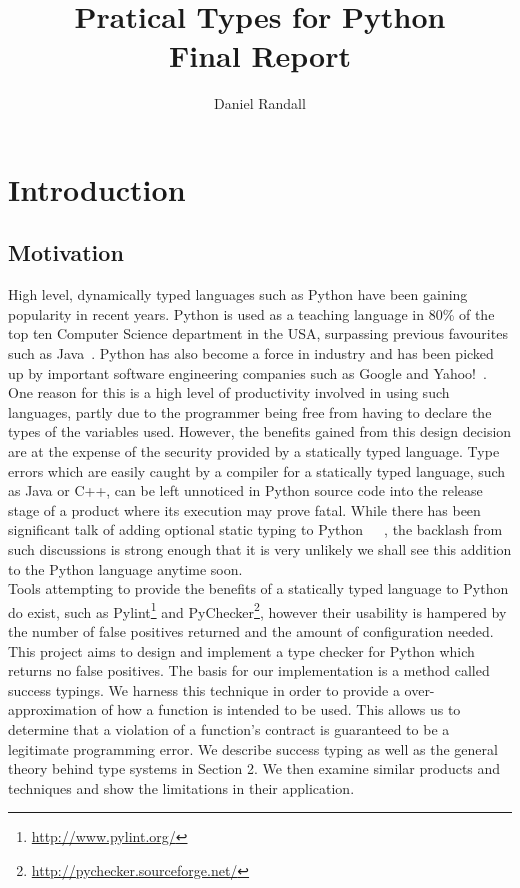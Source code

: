 \documentclass[12pt, titlepage]{article}
\title{Pratical Types for Python \\ Final Report}
\author{Daniel Randall}
\date{}
\begin{document}
\maketitle

\tableofcontents
\newpage

\section{Introduction}
\subsection{Motivation}
High level, dynamically typed languages such as Python have been gaining popularity in recent years. Python is used as a teaching language in 80\% of the top ten Computer Science department in the USA, surpassing previous favourites such as Java~\cite{guoTeaching}. Python has also become a force in industry and has been picked up by important software engineering companies such as Google and Yahoo!~\cite{organisationsPython}. One reason for this is a high level of productivity involved in using such languages, partly due to the programmer being free from having to declare the types of the variables used. However, the benefits gained from this design decision are at the expense of the security provided by a statically typed language. Type errors which are easily caught by a compiler for a statically typed language, such as Java or C++, can be left unnoticed in Python source code into the release stage of a product where its execution may prove fatal. %
While there has been significant talk of adding optional static typing to Python~\cite{guido1}~\cite{guido2}~\cite{guido3}, the backlash from such discussions is strong enough that it is very unlikely we shall see this addition to the Python language anytime soon. \\
Tools attempting to provide the benefits of a statically typed language to Python do exist, such as Pylint\footnote{\url{http://www.pylint.org/}} and PyChecker\footnote{\url{http://pychecker.sourceforge.net/}}, however their usability is hampered by the number of false positives returned and the amount of configuration needed. \\
This project aims to design and implement a type checker for Python which returns no false positives. The basis for our implementation is a method called success typings. We harness this technique in order to provide a over-approximation of how a function is intended to be used. This allows us to determine that a violation of a function's contract is guaranteed to be a legitimate programming error. We describe success typing as well as the general theory behind type systems in Section 2. We then examine similar products and techniques and show the limitations in their application. \\
\end{document}
